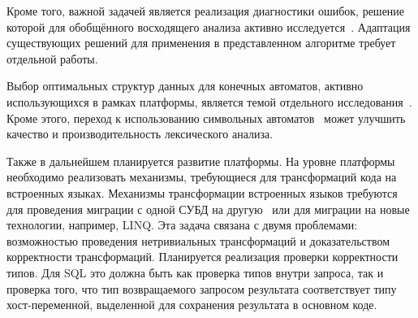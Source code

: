 Кроме того, важной задачей является реализация диагностики ошибок, решение которой для обобщённого восходящего анализа активно исследуется~\cite{RNGLRSyntaxerror1,RNGLRSyntaxerror2, RNGLRSyntaxerror3, RNGLRSyntaxerror4}. Адаптация существующих решений для применения в представленном алгоритме требует отдельной работы.

Выбор оптимальных структур данных для конечных автоматов, активно использующихся в рамках платформы, является темой отдельного исследования~\cite{DataStructureForFA}. Кроме этого, переход к использованию символьных автоматов~\cite{symbolicFA1,symbolicFA2} может улучшить качество и производительность лексического анализа.

Также в дальнейшем планируется развитие платформы. На уровне платформы необходимо реализовать механизмы, требующиеся для трансформаций кода на встроенных языках. Механизмы трансформации встроенных языков требуются для проведения миграции с одной СУБД на другую~\cite{Syrcose} или для миграции на новые технологии, например, LINQ. Эта задача связана с двумя проблемами: возможностью проведения нетривиальных трансформаций и доказательством корректности трансформаций. Планируется реализация проверки корректности типов. Для SQL это должна быть как проверка типов внутри запроса, так и проверка того, что тип возвращаемого запросом результата соответствует типу хост-переменной, выделенной для сохранения результата в основном коде.

\clearpage
